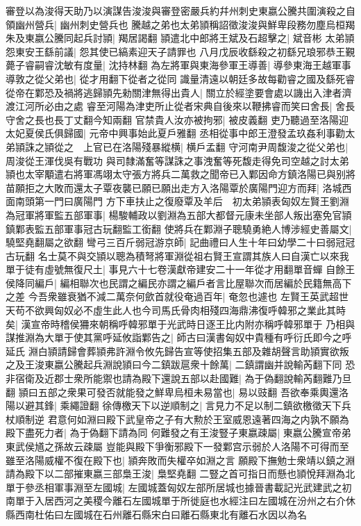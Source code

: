 審登以為浚得天助乃以演謀告浚浚與審登密嚴兵約幷州刺史東嬴公騰共圍演殺之自領幽州營兵|{
	幽州刺史營兵也}
騰越之弟也太弟頴稱詔徵浚浚與鮮卑段務勿塵烏桓羯朱及東嬴公騰同起兵討頴|{
	羯居謁翻}
頴遣北中郎將王斌及石超擊之|{
	斌音彬}
太弟頴怨東安王繇前議|{
	怨其使已縞素迎天子請罪也}
八月戊辰收繇殺之初繇兄琅邪恭王覲薨子睿嗣睿沈敏有度量|{
	沈持林翻}
為左將軍與東海參軍王導善|{
	導參東海王越軍事}
導敦之從父弟也|{
	從才用翻下從者之從同}
識量清遠以朝廷多故每勸睿之國及繇死睿從帝在鄴恐及禍將逃歸頴先勑關津無得出貴人|{
	關立於經塗要會處以譏出入津者濟渡江河所必由之處}
睿至河陽為津吏所止從者宋典自後來以鞭拂睿而笑曰舍長|{
	舍長守舍之長也長丁丈翻今知兩翻}
官禁貴人汝亦被拘邪|{
	被皮義翻}
吏乃聽過至洛陽迎太妃夏侯氏俱歸國|{
	元帝中興事始此夏戶雅翻}
丞相從事中郎王澄發孟玖姦利事勸太弟頴誅之頴從之　上官已在洛陽殘暴縱横|{
	横戶孟翻}
守河南尹周馥浚之從父弟也|{
	周浚從王渾伐吳有戰功}
與司隸滿奮等謀誅之事洩奮等死馥走得免司空越之討太弟頴也太宰顒遣右將軍馮翊太守張方將兵二萬救之聞帝已入鄴因命方鎮洛陽已與别將苗願拒之大敗而還太子覃夜襲已願已願出走方入洛陽覃於廣陽門迎方而拜|{
	洛城西面南頭第一門曰廣陽門}
方下車扶止之復廢覃及羊后　初太弟頴表匈奴左賢王劉淵為冠軍將軍監五部軍事|{
	楊駿輔政以劉淵為五部大都督元康未坐部人叛出塞免官頴鎮鄴表監五部軍事冠古玩翻監工銜翻}
使將兵在鄴淵子聰驍勇絶人博涉經史善屬文|{
	驍堅堯翻屬之欲翻}
彎弓三百斤弱冠游京師|{
	記曲禮曰人生十年曰幼學二十曰弱冠冠古玩翻}
名士莫不與交頴以聰為積弩將軍淵從祖右賢王宣謂其族人曰自漢亡以來我單于徒有虛號無復尺土|{
	事見六十七卷漢獻帝建安二十一年從才用翻單音蟬}
自餘王侯降同編戶|{
	編相聯次也民謂之編民亦謂之編戶者言比屋聯次而居編於民籍無高下之差}
今吾衆雖衰猶不減二萬奈何歛首就役奄過百年|{
	奄忽也遽也}
左賢王英武超世天苟不欲興匈奴必不虛生此人也今司馬氏骨肉相殘四海鼎沸復呼韓邪之業此其時矣|{
	漢宣帝時稽侯狦來朝稱呼韓邪單于光武時日逐王比内附亦稱呼韓邪單于}
乃相與謀推淵為大單于使其黨呼延攸詣鄴告之|{
	師古曰漢書匈奴中貴種有呼衍氏即今之呼延氏}
淵白頴請歸會葬頴弗許淵令攸先歸告宣等使招集五部及雜胡聲言助頴實欲叛之及王浚東嬴公騰起兵淵說頴曰今二鎮跋扈衆十餘萬|{
	二鎮謂幽并說輸芮翻下同}
恐非宿衛及近郡士衆所能禦也請為殿下還說五部以赴國難|{
	為于偽翻說輸芮翻難乃旦翻}
頴曰五部之衆果可發否就能發之鮮卑烏桓未易當也|{
	易以豉翻}
吾欲奉乘輿還洛陽以避其鋒|{
	乘繩證翻}
徐傳檄天下以逆順制之|{
	言見力不足以制二鎮欲檄徵天下兵杖順制逆}
君意何如淵曰殿下武皇帝之子有大勲於王室威恩遠著四海之内孰不願為殿下盡死力者|{
	為于偽翻下請為同}
何難發之有王浚豎子東嬴疎屬|{
	東嬴公騰宣帝弟東武侯馗之孫故云疎屬}
豈能與殿下爭衡邪殿下一發鄴宫示弱於人洛陽不可得而至雖至洛陽威權不復在殿下也|{
	頴奔敗而失權卒如淵之言}
願殿下撫勉士衆靖以鎮之淵請為殿下以二部摧東嬴三部梟王浚|{
	梟堅堯翻}
二豎之首可指日而懸也頴悅拜淵為北單于參丞相軍事淵至左國城|{
	左國城蓋匈奴左部所居城也據晉書載記光武建武之初南單于入居西河之美稷今離石左國城單于所徙庭也水經注曰左國城在汾州之右介休縣西南杜佑曰左國城在石州離石縣宋白曰離石縣東北有離石水因以為名}

